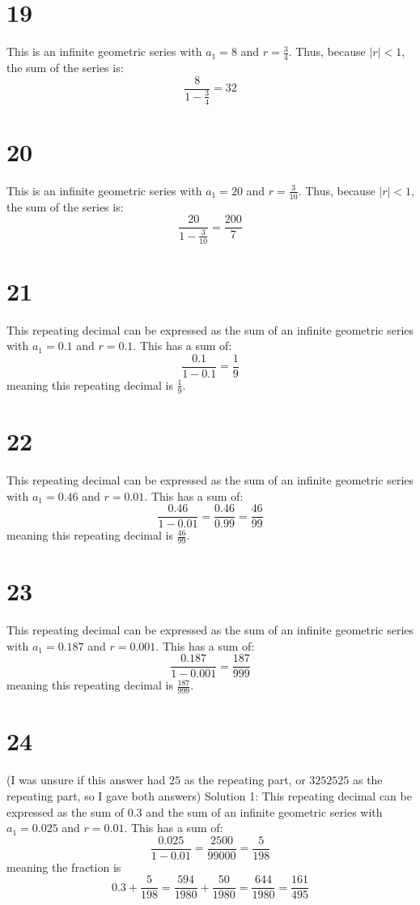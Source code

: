 \documentclass{article}
\theoremstyle{definition}
\newcommand{\?}{\stackrel{?}{=}}
\begin{document}
\section*{19}
This is an infinite geometric series with $a_1=8$ and $r=\frac{3}{4}$. Thus, because $|r|<1$, the sum of the series is:
\[ \frac{8}{1-\frac{3}{4}}=32 \]

\section*{20}
This is an infinite geometric series with $a_1=20$ and $r=\frac{3}{10}$. Thus, because $|r|<1$, the sum of the series is:
\[ \frac{20}{1-\frac{3}{10}}=\frac{200}{7} \]

\section*{21}
This repeating decimal can be expressed as the sum of an infinite geometric series with $a_1=0.1$ and $r=0.1$. This has a sum of:
\[ \frac{0.1}{1-0.1}=\frac{1}{9} \] meaning this repeating decimal is $\frac{1}{9}$.

\section*{22}
This repeating decimal can be expressed as the sum of an infinite geometric series with $a_1=0.46$ and $r=0.01$. This has a sum of:
\[ \frac{0.46}{1-0.01}=\frac{0.46}{0.99}=\frac{46}{99} \] meaning this repeating decimal is $\frac{46}{99}$.

\section*{23}
This repeating decimal can be expressed as the sum of an infinite geometric series with $a_1=0.187$ and $r=0.001$. This has a sum of:
\[ \frac{0.187}{1-0.001}=\frac{187}{999} \] meaning this repeating decimal is $\frac{187}{999}$.

\section*{24}
(I was unsure if this answer had $25$ as the repeating part, or $3252525$ as the repeating part, so I gave both answers)\newline
Solution 1: This repeating decimal can be expressed as the sum of $0.3$ and the sum of an infinite geometric series with $a_1=0.025$ and $r=0.01$. This has a sum of:
\[ \frac{0.025}{1-0.01}=\frac{2500}{99000}=\frac{5}{198} \] meaning the fraction is 
\[ 0.3+\frac{5}{198}=\frac{594}{1980}+\frac{50}{1980}=\frac{644}{1980}=\frac{161}{495} \]
\end{document}
